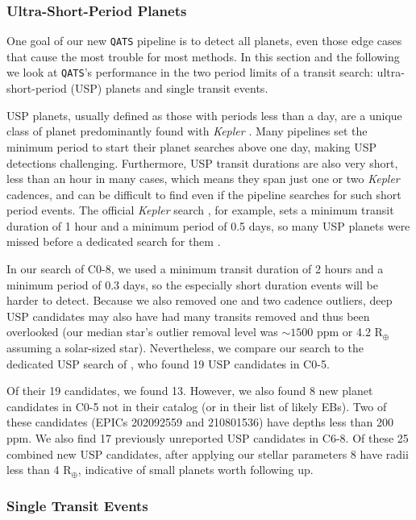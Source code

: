 \documentclass[twocolumn]{aastex62}
\newcommand{\project}[1]{\textsl{#1}}
\newcommand{\pipeline}[1]{\texttt{#1}}
\newcommand{\nnewusp}{25}
\begin{document}
\subsubsection{Ultra-Short-Period Planets}
\label{usps}

One goal of our new \pipeline{QATS} pipeline is to detect all planets,
even those edge cases that cause the most trouble for most methods. In
this section and the following we look at \pipeline{QATS}'s
performance in the two period limits of a transit search:
ultra-short-period (USP) planets and single transit events.

USP planets, usually defined as those with periods less than a day,
are a unique class of planet predominantly found with \project{Kepler}
\citep{san14}. Many pipelines set the minimum period to start their
planet searches above one day, making USP detections
challenging. Furthermore, USP transit durations are also very short,
less than an hour in many cases, which means they span just one or two
\project{Kepler} cadences, and can be difficult to find even if the
pipeline searches for such short period events. The official
\project{Kepler} search \citep[TPS;][]{jen10b}, for example, sets a
minimum transit duration of 1 hour and a minimum period of 0.5 days,
so many USP planets were missed before a dedicated search for them
\citep{san14}.

In our search of C0-8, we used a minimum transit duration of 2 hours
and a minimum period of 0.3 days, so the especially short duration
events will be harder to detect. Because we also removed one and two
cadence outliers, deep USP candidates may also have had many transits
removed and thus been overlooked (our median star's outlier removal
level was $\sim 1500$ ppm or 4.2 R$_\oplus$ assuming a solar-sized
star). Nevertheless, we compare our search to the dedicated USP search
of \cite{ada16}, who found 19 USP candidates in C0-5.

Of their 19 candidates, we found 13. However, we also found 8 new
planet candidates in C0-5 not in their catalog (or in their list of
likely EBs). Two of these candidates (EPICs 202092559 and 210801536)
have depths less than 200 ppm. We also find 17 previously unreported
USP candidates in C6-8.  Of these \nnewusp{} combined new USP
candidates, after applying our stellar parameters 8 have radii less
than 4 R$_\oplus$, indicative of small planets worth following up.


\subsubsection{Single Transit Events}
\label{singletransits}
\end{document}

